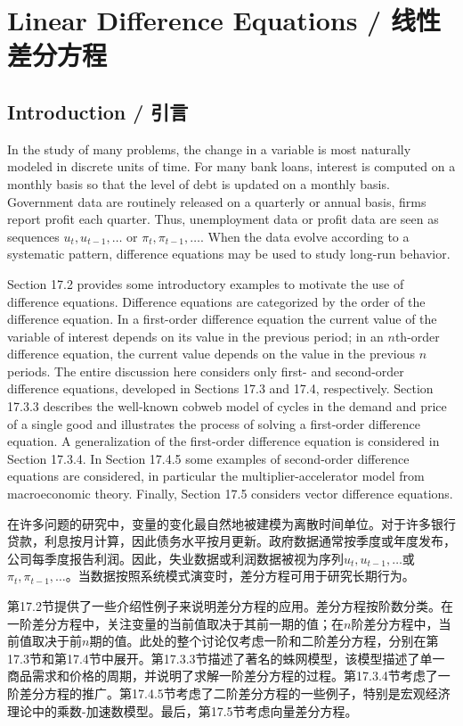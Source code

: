 \chapter{Linear Difference Equations / 线性差分方程}

\section{Introduction / 引言}

\begin{original}
In the study of many problems, the change in a variable is most naturally modeled in discrete units of time. For many bank loans, interest is computed on a monthly basis so that the level of debt is updated on a monthly basis. Government data are routinely released on a quarterly or annual basis, firms report profit each quarter. Thus, unemployment data or profit data are seen as sequences $u_t, u_{t-1}, \ldots$ or $\pi_t, \pi_{t-1}, \ldots$. When the data evolve according to a systematic pattern, difference equations may be used to study long-run behavior.

Section 17.2 provides some introductory examples to motivate the use of difference equations. Difference equations are categorized by the order of the difference equation. In a first-order difference equation the current value of the variable of interest depends on its value in the previous period; in an $n$th-order difference equation, the current value depends on the value in the previous $n$ periods. The entire discussion here considers only first- and second-order difference equations, developed in Sections 17.3 and 17.4, respectively. Section 17.3.3 describes the well-known cobweb model of cycles in the demand and price of a single good and illustrates the process of solving a first-order difference equation. A generalization of the first-order difference equation is considered in Section 17.3.4. In Section 17.4.5 some examples of second-order difference equations are considered, in particular the multiplier-accelerator model from macroeconomic theory. Finally, Section 17.5 considers vector difference equations.
\end{original}
\begin{translation}
在许多问题的研究中，变量的变化最自然地被建模为离散时间单位。对于许多银行贷款，利息按月计算，因此债务水平按月更新。政府数据通常按季度或年度发布，公司每季度报告利润。因此，失业数据或利润数据被视为序列$u_t, u_{t-1}, \ldots$或$\pi_t, \pi_{t-1}, \ldots$。当数据按照系统模式演变时，差分方程可用于研究长期行为。

第17.2节提供了一些介绍性例子来说明差分方程的应用。差分方程按阶数分类。在一阶差分方程中，关注变量的当前值取决于其前一期的值；在$n$阶差分方程中，当前值取决于前$n$期的值。此处的整个讨论仅考虑一阶和二阶差分方程，分别在第17.3节和第17.4节中展开。第17.3.3节描述了著名的蛛网模型，该模型描述了单一商品需求和价格的周期，并说明了求解一阶差分方程的过程。第17.3.4节考虑了一阶差分方程的推广。第17.4.5节考虑了二阶差分方程的一些例子，特别是宏观经济理论中的乘数-加速数模型。最后，第17.5节考虑向量差分方程。
\end{translation}


